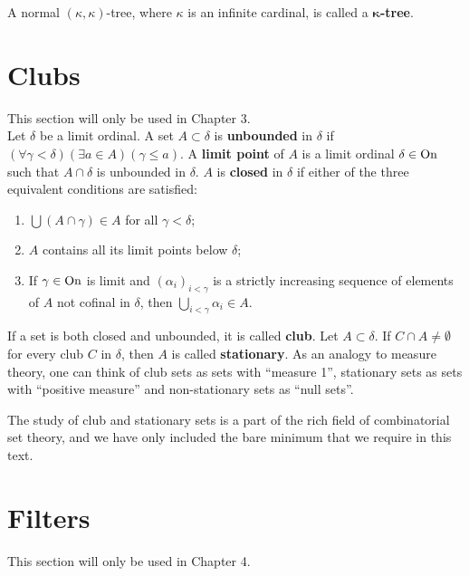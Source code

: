 A normal $(\kappa,\kappa)$-tree, where $\kappa$ is an infinite cardinal, is called a \textbf{$\boldsymbol\kappa$-tree}.

\section{Clubs}
This section will only be used in Chapter 3.\\

Let $\delta$ be a limit ordinal. A set $A\subset\delta$ is \textbf{unbounded} in $\delta$ if $(\forall\gamma<\delta)(\exists a\in A)(\gamma\leq a)$. A \textbf{limit point} of $A$ is a limit ordinal $\delta\in\operatorname{On}$ such that $A\cap\delta$ is unbounded in $\delta$. $A$ is \textbf{closed} in $\delta$ if either of the three equivalent conditions are satisfied:
\begin{enumerate}
\item $\bigcup(A\cap\gamma)\in A$ for all $\gamma<\delta$;
\item $A$ contains all its limit points below $\delta$;
\item If $\gamma\in\operatorname{On}$ is limit and $(\alpha_i)_{i<\gamma}$ is a strictly increasing sequence of elements of $A$ not cofinal in $\delta$, then $\bigcup_{i<\gamma}\alpha_i\in A$.\\
\end{enumerate}

If a set is both closed and unbounded, it is called \textbf{club}. Let $A\subset\delta$. If $C\cap A\neq\emptyset$ for every club $C$ in $\delta$, then $A$ is called \textbf{stationary}. As an analogy to measure theory, one can think of club sets as sets with ``measure 1'', stationary sets as sets with ``positive measure'' and non-stationary sets as ``null sets''.


The study of club and stationary sets is a part of the rich field of combinatorial set theory, and we have only included the bare minimum that we require in this text.

\section{Filters}
This section will only be used in Chapter 4.


